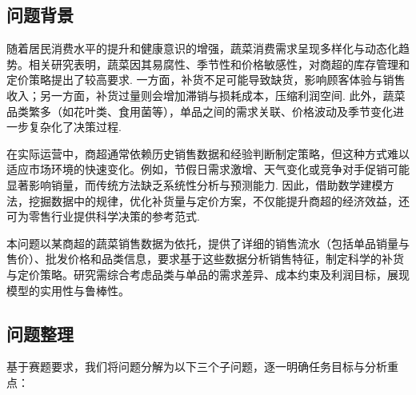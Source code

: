 \documentclass{cumcmthesis} %
\begin{document}
\subsection{问题背景}

随着居民消费水平的提升和健康意识的增强，蔬菜消费需求呈现多样化与动态化趋势。相关研究表明，蔬菜因其易腐性、季节性和价格敏感性，对商超的库存管理和定价策略提出了较高要求\cite{Chopra2007}. 一方面，补货不足可能导致缺货，影响顾客体验与销售收入；另一方面，补货过量则会增加滞销与损耗成本，压缩利润空间\cite{Levy2012retailing}. 此外，蔬菜品类繁多（如花叶类、食用菌等），单品之间的需求关联、价格波动及季节变化进一步复杂化了决策过程\cite{3}.

在实际运营中，商超通常依赖历史销售数据和经验判断制定策略，但这种方式难以适应市场环境的快速变化。例如，节假日需求激增、天气变化或竞争对手促销可能显著影响销量，而传统方法缺乏系统性分析与预测能力\cite{Hyndman2018forecasting}. 因此，借助数学建模方法，挖掘数据中的规律，优化补货量与定价方案，不仅能提升商超的经济效益，还可为零售行业提供科学决策的参考范式\cite{talluri2006theory}.

本问题以某商超的蔬菜销售数据为依托，提供了详细的销售流水（包括单品销量与售价）、批发价格和品类信息，要求基于这些数据分析销售特征，制定科学的补货与定价策略。研究需综合考虑品类与单品的需求差异、成本约束及利润目标，展现模型的实用性与鲁棒性。

\subsection{问题整理}

基于赛题要求，我们将问题分解为以下三个子问题，逐一明确任务目标与分析重点：
\end{document}

